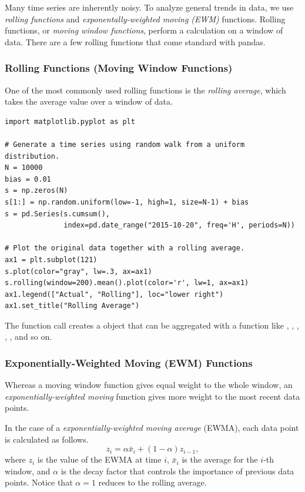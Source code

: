 Many time series are inherently noisy.
To analyze general trends in data, we use \emph{rolling functions} and \emph{exponentally-weighted moving (EWM)} functions.
Rolling functions, or \emph{moving window functions}, perform a calculation on a window of data.
There are a few rolling functions that come standard with pandas.

\subsubsection*{Rolling Functions (Moving Window Functions)}

One of the most commonly used rolling functions is the \emph{rolling average}, which takes the average value over a window of data.

\begin{lstlisting}
import matplotlib.pyplot as plt

# Generate a time series using random walk from a uniform distribution.
N = 10000
bias = 0.01
s = np.zeros(N)
s[1:] = np.random.uniform(low=-1, high=1, size=N-1) + bias
s = pd.Series(s.cumsum(),
              index=pd.date_range("2015-10-20", freq='H', periods=N))

# Plot the original data together with a rolling average.
ax1 = plt.subplot(121)
s.plot(color="gray", lw=.3, ax=ax1)
s.rolling(window=200).mean().plot(color='r', lw=1, ax=ax1)
ax1.legend(["Actual", "Rolling"], loc="lower right")
ax1.set_title("Rolling Average")
\end{lstlisting}

The function call  creates a  object that can be aggregated with a function like , , , , , and so on.

\subsubsection*{Exponentially-Weighted Moving (EWM) Functions}

Whereas a moving window function gives equal weight to the whole window, an \emph{exponentially-weighted moving} function gives more weight to the most recent data points.

In the case of a \emph{exponentially-weighted moving average} (EWMA), each data point is calculated as follows.
\[
z_i = \alpha \bar{x}_i + (1 - \alpha)z_{i-1},
\]
where $z_i$ is the value of the EWMA at time $i$, $\bar{x}_i$ is the average for the $i$-th window, and $\alpha$ is the decay factor that controls the importance of previous data points.
Notice that $\alpha=1$ reduces to the rolling average.

